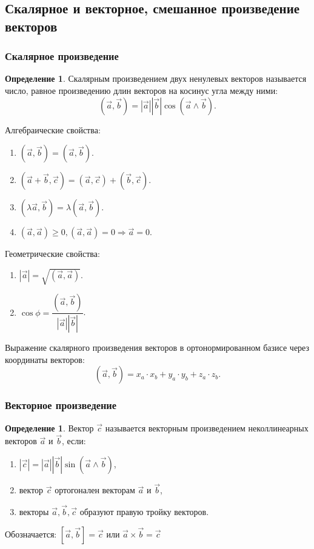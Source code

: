 \documentclass[12pt]{report}
\theoremstyle{definition}
\newtheorem{definition}[theorem]{Определение}
\begin{document}
\subsection{Скалярное и векторное, смешанное произведение векторов}
\subsubsection{Скалярное произведение}
\begin{definition}
Скалярным произведением двух ненулевых векторов называется
число, равное произведению длин векторов на косинус угла между
ними:
$$
(\vec{a}, \vec{b}) = |\vec{a}| |\vec{b}| \cos(\vec{a} \wedge \vec{b}).
$$
\end{definition}

Алгебраические свойства:
\begin{enumerate}
\item $(\vec{a}, \vec{b}) = (\vec{a}, \vec{b})$.
\item $(\vec{a} + \vec{b}, \vec{c}) = (\vec{a}, \vec{c}) + (\vec{b}, \vec{c})$.
\item $(\lambda \vec{a}, \vec{b}) = \lambda (\vec{a}, \vec{b})$.
\item $(\vec{a}, \vec{a}) \ge 0, (\vec{a}, \vec{a}) = 0 \Rightarrow \vec{a} = 0$.
\end{enumerate}

Геометрические свойства:
\begin{enumerate}
\item $|\vec{a}| = \sqrt{(\vec{a}, \vec{a})}$.
\item $\cos \phi = \dfrac{(\vec{a}, \vec{b})}{|\vec{a}||\vec{b}|}$.
\end{enumerate}

Выражение скалярного произведения векторов в ортонормированном
базисе через координаты векторов:
$$
(\vec{a}, \vec{b}) = x_a \cdot x_b + y_a \cdot y_b + z_a \cdot z_b.
$$

\subsubsection{Векторное произведение}
\begin{definition}
Вектор $\vec{c}$ называется векторным произведением неколлинеарных векторов 
$\vec{a}$ и $\vec{b}$, если:
\begin{enumerate}
  \item $|\vec{c}| = |\vec{a}| |\vec{b}| \sin(\vec{a} \wedge \vec{b})$,
  \item вектор $\vec{c}$ ортогонален векторам $\vec{a}$ и $\vec{b}$,
  \item векторы $\vec{a}, \vec{b}, \vec{c}$ образуют правую тройку векторов.
\end{enumerate}

Обозначается: $[\vec{a}, \vec{b}] = \vec{c}$ или $\vec{a} \times \vec{b} = \vec{c}$

\end{definition}
\end{document}
